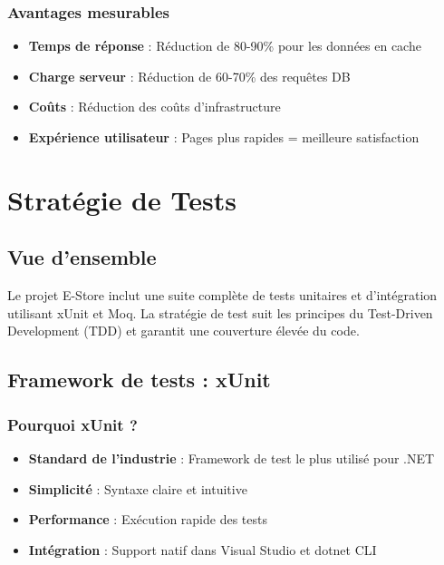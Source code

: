 \documentclass[12pt,a4paper]{article}
\begin{document}
\subsubsection{Avantages mesurables}

\begin{itemize}
    \item \textbf{Temps de réponse} : Réduction de 80-90\% pour les données en cache
    \item \textbf{Charge serveur} : Réduction de 60-70\% des requêtes DB
    \item \textbf{Coûts} : Réduction des coûts d'infrastructure
    \item \textbf{Expérience utilisateur} : Pages plus rapides = meilleure satisfaction
\end{itemize}

\section{Stratégie de Tests}

\subsection{Vue d'ensemble}

Le projet E-Store inclut une suite complète de tests unitaires et d'intégration utilisant xUnit et Moq. La stratégie de test suit les principes du Test-Driven Development (TDD) et garantit une couverture élevée du code.

\subsection{Framework de tests : xUnit}

\subsubsection{Pourquoi xUnit ?}

\begin{itemize}
    \item \textbf{Standard de l'industrie} : Framework de test le plus utilisé pour .NET
    \item \textbf{Simplicité} : Syntaxe claire et intuitive
    \item \textbf{Performance} : Exécution rapide des tests
    \item \textbf{Intégration} : Support natif dans Visual Studio et dotnet CLI
\end{itemize}
\end{document}
